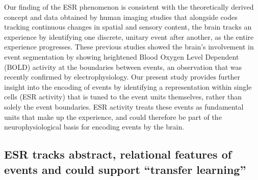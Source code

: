 Our finding of the ESR phenomenon is consistent with the theoretically derived concept and data obtained by human imaging studies that alongside codes tracking continuous changes in spatial and sensory content, the brain tracks an experience by identifying one discrete, unitary event after another, as the entire experience progresses. These previous studies showed the brain's involvement in event segmentation by showing heightened Blood Oxygen Level Dependent (BOLD) activity at the boundaries between events, an observation that was recently confirmed by electrophysiology. Our present study provides further insight into the encoding of events by identifying a representation within single cells (ESR activity) that is tuned to the event units themselves, rather than solely the event boundaries. ESR activity treats these events as fundamental units that make up the experience, and could therefore be part of the neurophysiological basis for encoding events by the brain.

\subsection{ESR tracks abstract, relational features of events and could support ``transfer learning''}

